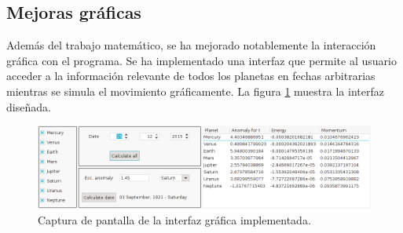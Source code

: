 \documentclass[a4paper, 11pt]{article}
\begin{document}
  \subsection{Mejoras gráficas}

  Además del trabajo matemático, se ha mejorado notablemente la interacción gráfica con el programa. Se ha implementado una interfaz que permite al usuario acceder a la información relevante de todos los planetas en fechas arbitrarias mientras se simula el movimiento gráficamente. La figura \ref{fig_gui} muestra la interfaz diseñada.

    \begin{figure}[ht!]
        \centering
        \includegraphics[width=140mm]{./screenshot_GUI.png}
        \caption{Captura de pantalla de la interfaz gráfica implementada. \label{fig_gui}}
    \end{figure}
\end{document}
